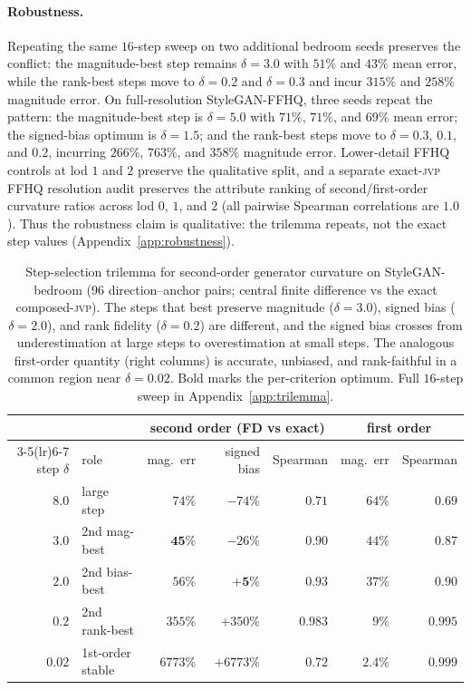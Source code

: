 \documentclass[10pt]{article}
\newcommand{\jvp}{\textsc{jvp}}
\begin{document}
\paragraph{Robustness.} Repeating the same $16$-step sweep on two additional bedroom seeds preserves the
conflict: the magnitude-best step remains $\delta=3.0$ with $51\%$ and $43\%$ mean error, while the
rank-best steps move to $\delta=0.2$ and $\delta=0.3$ and incur $315\%$ and $258\%$ magnitude error.
On full-resolution StyleGAN-FFHQ, three seeds repeat the pattern: the magnitude-best step is
$\delta=5.0$ with $71\%$, $71\%$, and $69\%$ mean error; the signed-bias optimum is $\delta=1.5$; and
the rank-best steps move to $\delta=0.3$, $0.1$, and $0.2$, incurring $266\%$, $763\%$, and $358\%$
magnitude error. Lower-detail FFHQ controls at lod $1$ and $2$ preserve the qualitative split, and a
separate exact-\jvp{} FFHQ resolution audit preserves the attribute ranking of second/first-order
curvature ratios across lod $0$, $1$, and $2$ (all pairwise Spearman correlations are $1.0$). Thus the
robustness claim is qualitative: the trilemma repeats, not the exact step values
(Appendix~\ref{app:robustness}).

\begin{table}[t]\centering
\begin{tabular}{r l rrr rr}
\toprule
& & \multicolumn{3}{c}{second order (FD vs exact)} & \multicolumn{2}{c}{first order} \\
\cmidrule(lr){3-5}\cmidrule(lr){6-7}
step $\delta$ & role & mag.\ err & signed bias & Spearman & mag.\ err & Spearman \\
\midrule
$8.0$          & large step        & $74\%$           & $-74\%$            & $0.71$           & $64\%$          & $0.69$            \\
$\mathbf{3.0}$ & 2nd mag-best      & $\mathbf{45\%}$  & $-26\%$            & $0.90$           & $44\%$          & $0.87$            \\
$\mathbf{2.0}$ & 2nd bias-best     & $56\%$           & $\mathbf{+5\%}$    & $0.93$           & $37\%$          & $0.90$            \\
$\mathbf{0.2}$ & 2nd rank-best     & $355\%$          & $+350\%$           & $\mathbf{0.983}$ & $9\%$           & $0.995$           \\
$0.02$         & 1st-order stable  & $6773\%$         & $+6773\%$          & $0.72$           & $\mathbf{2.4\%}$ & $\mathbf{0.999}$ \\
\bottomrule
\end{tabular}
\caption{Step-selection trilemma for second-order generator curvature on StyleGAN-bedroom ($96$
direction--anchor pairs; central finite difference vs the exact composed-\jvp{}). The steps that best
preserve magnitude ($\delta=3.0$), signed bias ($\delta=2.0$), and rank fidelity ($\delta=0.2$) are
different, and the signed bias crosses from underestimation at large steps to overestimation at small
steps. The analogous first-order quantity (right columns) is accurate, unbiased, and rank-faithful in a
common region near $\delta=0.02$. Bold marks the per-criterion optimum. Full $16$-step sweep in
Appendix~\ref{app:trilemma}.}
\label{tab:trilemma}
\end{table}
\end{document}
